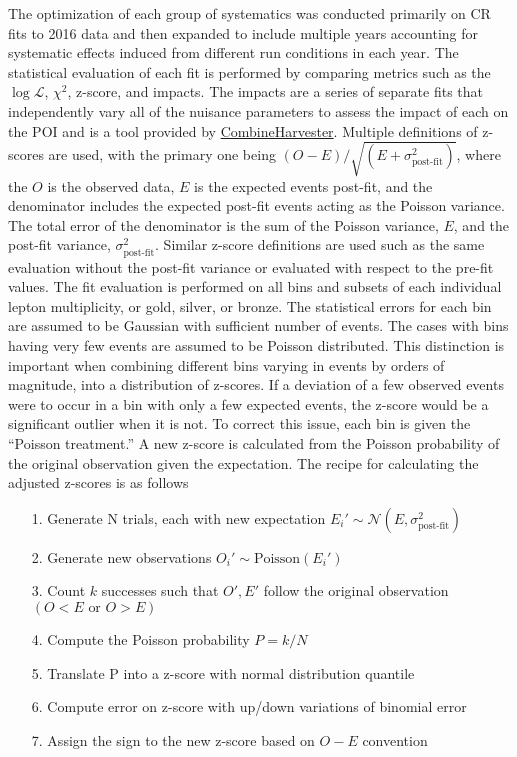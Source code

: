 The optimization of each group of systematics was conducted primarily on CR fits to 2016 data and then expanded to include multiple years accounting for systematic effects induced from different run conditions in each year. The statistical evaluation of each fit is performed by comparing metrics such as the $\log\mathcal{L}$, $\chi^2$, z-score, and impacts. The impacts are a series of separate fits that independently vary all of the nuisance parameters to assess the impact of each on the POI and is a tool provided by \url{CombineHarvester}. Multiple definitions of z-scores are used, with the primary one being $ (O-E)/\sqrt{(E+\sigma_{\text{post-fit}}^2)}$, where the $O$ is the observed data, $E$ is the expected events post-fit, and the denominator includes the expected post-fit events acting as the Poisson variance. The total error of the denominator is the sum of the Poisson variance, $E$, and the post-fit variance, $\sigma_{\text{post-fit}}^2$. Similar z-score definitions are used such as the same evaluation without the post-fit variance or evaluated with respect to the pre-fit values. The fit evaluation is performed on all bins and subsets of each individual lepton multiplicity, or gold, silver, or bronze. The statistical errors for each bin are assumed to be Gaussian with sufficient number of events. The cases with bins having very few events are assumed to be Poisson distributed. This distinction is important when combining different bins varying in events by orders of magnitude, into a distribution of z-scores. If a deviation of a few observed events were to occur in a bin with only a few expected events, the z-score would be a significant outlier when it is not. To correct this issue, each bin is given the ``Poisson treatment.'' A new z-score is calculated from the Poisson probability of the original observation given the expectation. The recipe for calculating the adjusted z-scores is as follows
\begin{itemize}
\item[1.] Generate N trials, each with new expectation $E_i' \sim \mathcal{N}(E,\sigma_{\text{post-fit}}^2)$
\item[2.] Generate new observations $O_i'\sim \text{Poisson}(E_i')$
\item[3.] Count $k$ successes such that $O',E'$ follow the original observation $(O<E \,\, \text{or} \, \, O>E)$
\item[4.] Compute the Poisson probability $P=k/N$ 
\item[5.] Translate P into a z-score with normal distribution quantile
\item[6.] Compute error on z-score with up/down variations of binomial error
\item[7.] Assign the sign to the new z-score based on $O-E$ convention
\end{itemize} 

